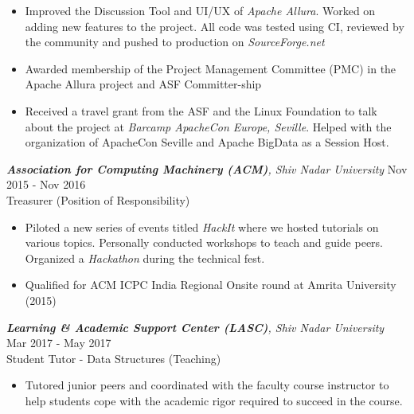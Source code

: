 \documentclass{resume_snu}[11pt]
\begin{document}
\begin{resume}
	\begin{itemize} \itemsep -2pt %
	\item Improved the Discussion Tool and UI/UX of\textit{ Apache Allura}. Worked on adding new
	features to the project. All code was tested using CI, reviewed by the community and
	pushed to production on \textit{SourceForge.net}
	\item Awarded membership of the Project Management Committee (PMC) in the Apache Allura project and ASF Committer-ship 
	\item Received a travel grant from the ASF and the Linux
	Foundation to talk about the project at \textit{Barcamp ApacheCon Europe, Seville}. Helped with the organization of ApacheCon Seville and Apache BigData as a Session Host.
	\end{itemize}\vspace{-10pt}
	
	{\sl \textbf{Association for Computing Machinery (ACM)}, Shiv Nadar University} \hfill        Nov 2015 - Nov 2016 \\
	Treasurer       \hfill   (Position of Responsibility)
	
	\begin{itemize} \itemsep -2pt %
		\item Piloted a new series of events titled \textit{HackIt} where we hosted tutorials on
		various topics. Personally conducted workshops to teach and guide peers. Organized a \textit{Hackathon} during the technical fest.
		\item Qualified for ACM ICPC India Regional Onsite round at Amrita University (2015)
	\end{itemize}\vspace{-10pt}
	
	{\sl \textbf{Learning \& Academic Support Center (LASC)}, Shiv Nadar University} \hfill        Mar 2017 - May 2017 \\
	Student Tutor - Data Structures       \hfill   (Teaching)
	
	\begin{itemize} \itemsep -2pt %
		\item Tutored junior peers and coordinated with the faculty course instructor to help students cope with the academic rigor required to succeed in the course.
	\end{itemize}\vspace{-10pt}


\vspace{-5pt}

\end{resume}
\end{document}
